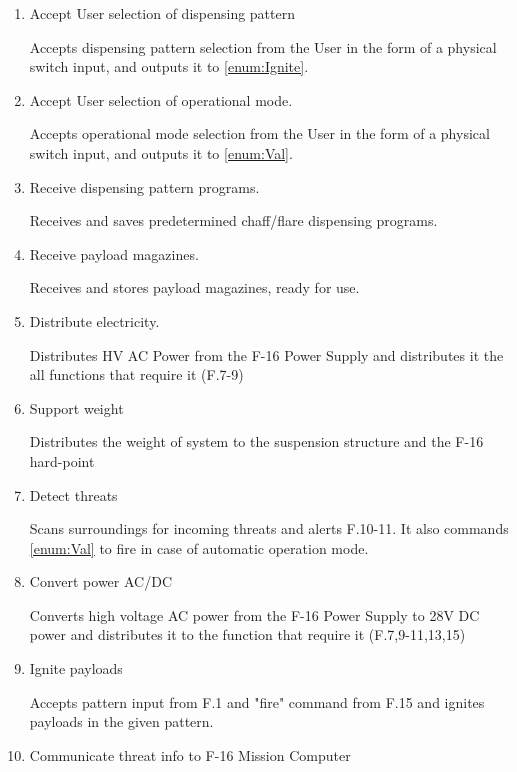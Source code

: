 \documentclass[Main]{subfiles}
\begin{document}
\begin{enumerate}[label=F.\arabic*]
\item Accept User selection of dispensing pattern\label{F-1}

Accepts dispensing pattern selection from the User in the form of a physical switch input, and outputs it to \ref{enum:Ignite}.

\item Accept User selection of operational mode.\label{F-2}

Accepts operational mode selection from the User in the form of a physical switch input, and outputs it to \ref{enum:Val}.

\item Receive dispensing pattern programs.\label{F-3}

Receives and saves predetermined chaff/flare dispensing programs.

\item Receive payload magazines.\label{F-4}

Receives and stores payload magazines, ready for use.

\item Distribute electricity.\label{F-5}

Distributes HV AC Power from the F-16 Power Supply and distributes it the all functions that require it (F.7-9)

\item Support weight\label{F-6}

Distributes the weight of system to the suspension structure and the F-16 hard-point

\item Detect threats\label{F-7}

Scans surroundings for incoming threats and alerts F.10-11. It also commands \ref{enum:Val} to fire in case of automatic operation mode.

\item Convert power AC/DC\label{F-8}

Converts high voltage AC power from the F-16 Power Supply to 28V DC power and distributes it to the function that require it (F.7,9-11,13,15)

\item Ignite payloads\label{enum:Ignite}\label{F-9}

Accepts pattern input from F.1 and "fire" command from F.15 and ignites payloads in the given pattern.

\item Communicate threat info to F-16 Mission Computer\label{F-10}


\end{enumerate}
\end{document}
